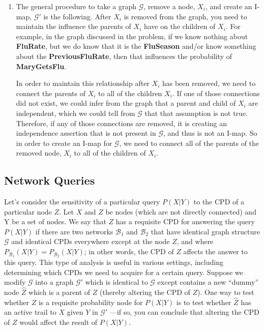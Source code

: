 \documentclass[12pt]{article}
\begin{document}
\begin{enumerate}

	\item The general procedure to take a graph $\mathcal{G}$, remove a node, $X_i$, and create
	an I-map, $\mathcal{G}'$ is the following. After $X_i$ is removed from the graph, you need
	to maintain the influence the parents of $X_i$ have on the children of $X_i$. For example,
	in the graph discussed in the problem, if we know nothing about \textbf{FluRate}, but we
	do know that it is the \textbf{FluSeason} and/or know something about the 
	\textbf{PreviousFluRate}, then that influences the probability of \textbf{MaryGetsFlu}.
	
	In order to maintain this relationship after $X_i$ has been removed, we need
	to connect the parents of $X_i$ to all of the children $X_i$. If one of those connections
	did not exist, we could infer from the graph that a parent and child of $X_i$ are independent,
	which we could tell from $\mathcal{G}$ that that assumption is not true. Therefore, if
	any of those connections are removed, it is creating an independence assertion that is not
	present in $\mathcal{G}$, and thus is not an I-map. So in order to create an I-map for
	$\mathcal{G}$, we need to connect all of the parents of the removed node, $X_i$ to all
	of the children of $X_i$.

\end{enumerate}

\subsection{Network Queries}
Let's consider the sensitivity of a particular query $P(X|Y)$ to the CPD of a particular node $Z$.
Let $X$ and $Z$ be nodes (which are not directly connected) and Y be a set of nodes. We say that $Z$ has a requisite CPD for answering the query $P(X|Y)$ if there are two networks $\mathcal{B}_1$ and $\mathcal{B}_2$
that have identical graph structure $\mathcal{G}$ and identical CPDs everywhere except at the node $Z$, and
where $P_{\mathcal{B}_1}(X|Y) = P_{\mathcal{B}_2}(X|Y)$; in other words, the CPD of $Z$ affects the answer to this query.
This type of analysis is useful in various settings, including determining which CPDs we need
to acquire for a certain query.
Suppose we modify $\mathcal{G}$ into a graph $\mathcal{G}'$
which is identical to $\mathcal{G}$ except contains a new ``dummy''
node $\hat{Z}$ which is a parent of $Z$ (thereby altering the CPD of $Z$). One way to test whether $Z$ is
a requisite probability node for $P(X|Y)$ is to test whether $\hat{Z}$ has an active trail to $X$ given $Y$
in $\mathcal{G}'$ 	—if so, you can conclude that altering the CPD of $Z$ would aﬀect the result of $P(X|Y)$. 
\end{document}

